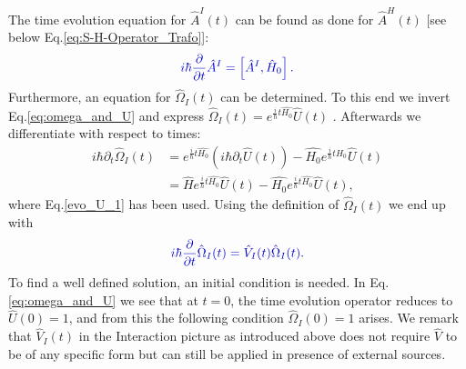 \documentclass[12pt, titlepage]{article}
\begin{document}
The time evolution equation for $ 	\hat{A}^{I}(t) $ can be found as done for $ \hat{A}^{H}(t) $ $ [ $see below Eq.\enskip\eqref{eq:S-H-Operator_Trafo}]:
\begin{equation}\label{eq:time_evo_equ_Intera}
\textcolor[RGB]{0,0,204}{
	i\hbar
	\frac{\partial}{\partial t}
	\hat{A}^{I}
	=
	\left[ 
	\hat{A}^{I},
	\hat{H}_{0}
	\right] .
}
\end{equation}
Furthermore, an equation for $ \hat{\Omega}_{I}(t) $ can be determined. To this end we invert Eq.\enskip\eqref{eq:omega_and_U} and express $  \hat{\Omega}_{I}(t) 
  		= e^{\frac{i}{\hbar}t \hat{H_{0}}}
			\hat{U}(t)  $ . Afterwards we differentiate with respect to times: 
\begin{subequations}
\begin{align}
  		i\hbar\partial_{t}\hat{\Omega}_{I}(t) 
  		 &= 
  		 e^{\frac{i}{\hbar}t\hat{H_{0}}}
  		 \left(i\hbar\partial_{t}\hat{U}(t) \right)
  		 -
  		 \hat{H_{0}}
   		 e^{\frac{i}{\hbar}t\hat{H_{0}}}
 		 \hat{U}(t)
  		 \\
  		 &=
  		 \hat{H}
  		  e^{\frac{i}{\hbar}t\hat{H_{0}}}  		 
  		 \hat{U}(t)  		 
  		 -
  		 \hat{H_{0}}
  		   e^{\frac{i}{\hbar}t\hat{H_{0}}}
  		 \hat{U}(t),
\end{align}
\end{subequations}
where Eq.\enskip\eqref{evo_U_1} has been used. Using the definition of $ \hat{\Omega}_{I}(t) $ we end up with
\begin{equation}\label{eq:time_evo_Omega_interaction}
\textcolor[RGB]{0,0,204}{
	i\hbar
	\frac{\partial}{\partial t}
	\hat{\Omega}_{I}(t)
	=
	\hat{V}_{I}(t)
	\hat{\Omega}_{I}(t)
.}
\end{equation}
To find a well defined solution, an initial condition is needed. In Eq.\enskip\eqref{eq:omega_and_U} we see that at $ t=0 $, the time evolution operator reduces to $ \hat{U}(0)=1 $, and from this the following condition $ \hat{\Omega}_{I}(0) = 1 $ arises.
We remark that $ \hat{V}_{I}(t) $ in the Interaction picture as introduced above does not require $ \hat{V} $ to be of any specific form but can still be applied in presence of external sources. 
\end{document}
